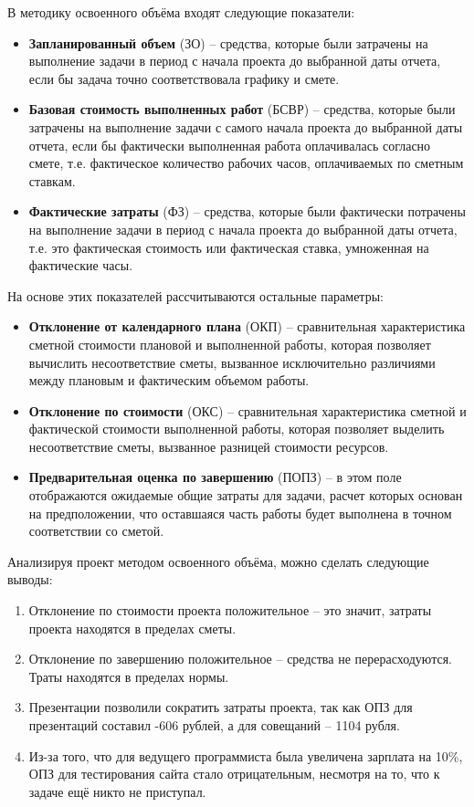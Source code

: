 В методику освоенного объёма входят следующие показатели:
\begin{itemize}
	\item \textbf{Запланированный объем} (ЗО) – средства, которые были затрачены на выполнение задачи в период с начала проекта до выбранной даты отчета, если бы задача точно соответствовала графику и смете.
	\item \textbf{Базовая стоимость выполненных работ} (БСВР) – средства, которые были затрачены на выполнение задачи с самого начала проекта до выбранной даты отчета, если бы фактически выполненная работа оплачивалась согласно смете, т.е. фактическое количество рабочих часов, оплачиваемых по сметным ставкам.
	\item \textbf{Фактические затраты} (ФЗ) – средства, которые были фактически потрачены на выполнение задачи в период с начала проекта до выбранной даты отчета, т.е. это фактическая стоимость или фактическая ставка, умноженная на фактические часы.
\end{itemize}

На основе этих показателей рассчитываются остальные параметры:
\begin{itemize}
	\item \textbf{Отклонение от календарного плана} (ОКП) – сравнительная характеристика сметной стоимости плановой и выполненной работы, которая позволяет вычислить несоответствие сметы, вызванное исключительно различиями между плановым и фактическим объемом работы.
	\item \textbf{Отклонение по стоимости} (ОКС) – сравнительная характеристика сметной и фактической стоимости выполненной работы, которая позволяет выделить несоответствие сметы, вызванное разницей стоимости ресурсов.
	\item \textbf{Предварительная оценка по завершению} (ПОПЗ) – в этом поле отображаются ожидаемые общие затраты для задачи, расчет которых основан на предположении, что оставшаяся часть работы будет выполнена в точном соответствии со сметой.
\end{itemize}

Анализируя проект методом освоенного объёма, можно сделать следующие выводы:
\begin{enumerate}
	\item Отклонение по стоимости проекта положительное -- это значит, затраты проекта находятся в пределах сметы.
	\item Отклонение по завершению положительное – средства не перерасходуются. Траты находятся в пределах нормы.
	\item Презентации позволили сократить затраты проекта, так как ОПЗ для презентаций составил -606 рублей, а для совещаний -- 1104 рубля.
	\item Из-за того, что для ведущего программиста была увеличена зарплата на 10\%, ОПЗ для тестирования сайта стало отрицательным, несмотря на то, что к задаче ещё никто не приступал.
\end{enumerate}

